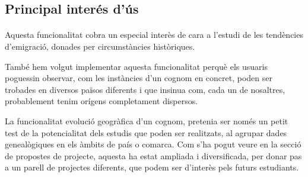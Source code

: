 \subsection{Principal interés d'ús}

\paragraph{}
Aquesta funcionalitat cobra un especial interès de cara a l’estudi de les tendències d'emigració, donades per circumstàncies històriques.

També hem volgut implementar aquesta funcionalitat perquè els usuaris poguessin observar, com les instàncies d'un cognom en concret, poden ser trobades en diversos països diferents i que insinua com, cada un de nosaltres, probablement tenim orígens completament dispersos.

La funcionalitat evolució geogràfica d’un cognom, pretenia ser només un petit test de la potencialitat dels estudis que poden ser realitzats, al agrupar dades genealògiques en els àmbits de país o comarca. Com s’ha pogut veure en la secció de propostes de projecte, aquesta ha estat ampliada i diversificada, per donar pas a un parell de projectes diferents, que podem ser d'interès pels futurs estudiants.
